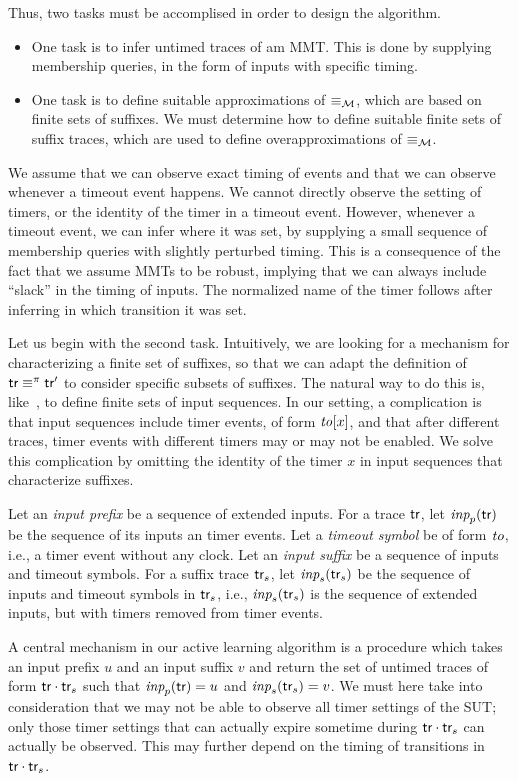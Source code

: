 Thus, two tasks must be accomplised in order to design the algorithm.
\begin{itemize}
  \item
    One task is to infer untimed traces of am MMT.
    This is done by supplying membership queries, in the form of inputs
    with specific timing.
\item
  One task is to define suitable approximations of $\equiv_{\cal M}$, which are
  based on finite sets of suffixes. We must determine how to define suitable
  finite sets of suffix traces, which are used to define overapproximations
  of $\equiv_{\cal M}$.
\end{itemize}
We assume that we can observe
exact timing of events and that we can observe whenever a timeout event
happens. We cannot directly observe the setting of timers, or the identity
of the timer in a timeout event. However, whenever a timeout event, we
can infer where it was set, by supplying a small sequence of membership queries
with slightly perturbed timing. This is a consequence of the fact that we
assume MMTs to be robust, implying that we can always include ``slack'' in
the timing of inputs. The normalized name of the timer follows after inferring
in which transition it was set.

Let us begin with the second task.
Intuitively, we are looking for a mechanism for characterizing a finite
set of suffixes, so that we can adapt the definition of
$\textsf{tr} \equiv^{\pi} \textsf{tr}'$ to consider specific subsets of
suffixes. The natural way to do this is, like~\cite{Nie03}, to define
finite sets of input sequences. In our setting, a complication is that
input sequences include timer events, of form $\mathit{to}[x]$, and that
after different traces, timer events with different timers may or may
not be enabled. We solve this complication by omitting the
identity of the timer $x$ in input sequences that characterize suffixes.

Let an \emph{input prefix} be a sequence of extended inputs.
For a trace $\textsf{tr}$, let $\textit{inp}_p(\textsf{tr})$ be the sequence of its
inputs an timer events.
Let a \emph{timeout symbol} be of form $\mathit{to}$, i.e., a
timer event without any clock.
Let an \emph{input suffix} be a sequence of inputs and timeout symbols.
For a suffix trace $\textsf{tr}_s$, let $\textit{inp}_s(\textsf{tr}_s)$ be the sequence
of inputs and timeout symbols in $\textsf{tr}_s$, i.e., $\textit{inp}_s(\textsf{tr}_s)$ is the
sequence of extended inputs, but with timers removed from timer events.

A central mechanism in our active learning algorithm is a procedure which
takes  an input prefix $u$ and an input suffix $v$ and return the set of
untimed traces of form $\textsf{tr}\cdot\textsf{tr}_s$ such that
$\textit{inp}_p(\textsf{tr}) = u$ and $\textit{inp}_s(\textsf{tr}_s) = v$. We must here take into
consideration that we may not be able to observe all timer settings of the
SUT; only those timer settings that can actually expire sometime during
$\textsf{tr}\cdot\textsf{tr}_s$ can actually be observed.
This may further depend on the timing of transitions
in $\textsf{tr}\cdot\textsf{tr}_s$.

